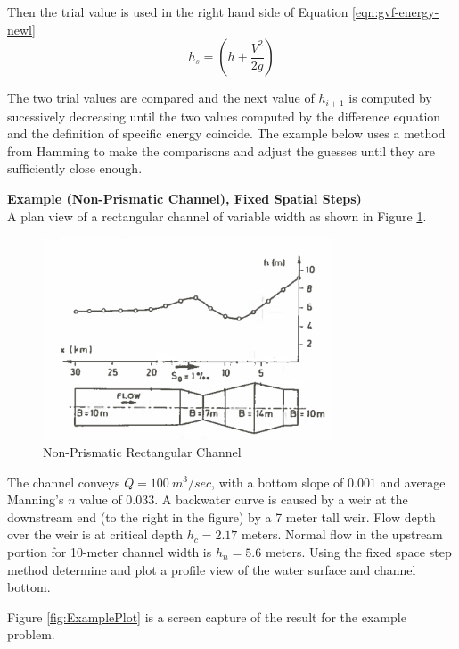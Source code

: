 Then the trial value is used in the right hand side of Equation \ref{eqn:gvf-energy-newl}
\begin{equation}
h_s = (h + \frac{V^2}{2g})
\label{eqn:gvf-energy-newl}
\end{equation}

The two trial values are compared and the next value of $h_{i+1}$ is computed by sucessively decreasing until the two values computed by the difference equation and the definition of specific energy coincide.  The example below uses a method from Hamming to make the comparisons and adjust the guesses until they are sufficiently close enough.

\textbf{Example (Non-Prismatic Channel), Fixed Spatial Steps)}\\
A plan view of a rectangular channel of variable width as shown in Figure \ref{fig:NonPrismaticExample}.
\begin{figure}[h!] %
   \centering
   \includegraphics[width=3.4in]{./13-SteadyWSP/NonPrismaticExample} 
   \caption{Non-Prismatic Rectangular Channel}
   \label{fig:NonPrismaticExample}
\end{figure}
\newpage
The channel conveys $Q=100~m^3/sec$, with a bottom slope of $0.001$ and average Manning's $n$ value of $0.033$.  
A backwater curve is caused by a weir at the downstream end (to the right in the figure) by a 7 meter tall weir.
Flow depth over the weir is at critical depth $h_c = 2.17$ meters.  Normal flow in the upstream portion for 10-meter channel width is $h_n = 5.6$ meters.  Using the fixed space step method determine and plot a profile view of the water surface and channel bottom.

Figure \ref{fig:ExamplePlot} is a screen capture of the result for the example problem.  

